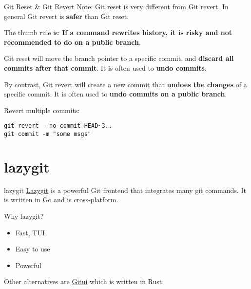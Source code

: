 \documentclass[aspectratio=169]{beamer}
\begin{document}
\begin{frame}[fragile]{Git Reset \& Git Revert}
    Note: Git reset is very different from Git revert.
    In general Git revert is \textbf{safer} than Git reset.

    \pause

    The thumb rule is: \textbf{If a command rewrites history, it is risky and not recommended to do on a public branch}.

    \pause

    Git reset will move the branch pointer to a specific commit, and \textbf{discard all commits after that commit}. It is often used to \textbf{undo commits}.

    \pause

    By contrast, Git revert will create a new commit that \textbf{undoes the changes} of a specific commit. It is often used to \textbf{undo commits on a public branch}.

    \pause
    \bigskip

    Revert multiple commits:
    \begin{verbatim}
git revert --no-commit HEAD~3..
git commit -m "some msgs"
    \end{verbatim}
\end{frame}

\section{lazygit}

\begin{frame}{lazygit}
    \href{https://github.com/jesseduffield/lazygit}{Lazygit} is a powerful Git frontend that integrates many git commands. It is written in Go and is cross-platform.

    \pause

    Why lazygit?
    \begin{itemize}
        \item Fast, TUI
        \item Easy to use
        \item Powerful
    \end{itemize}

    Other alternatives are \href{https://github.com/Extrawurst/gitui}{Gitui} which is written in Rust.
\end{frame}
\end{document}
